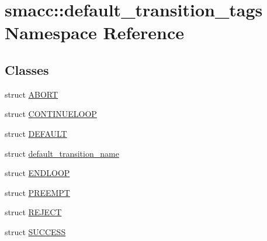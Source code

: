 \hypertarget{namespacesmacc_1_1default__transition__tags}{}\section{smacc\+:\+:default\+\_\+transition\+\_\+tags Namespace Reference}
\label{namespacesmacc_1_1default__transition__tags}
\subsection*{Classes}
\begin{DoxyCompactItemize}
\item 
struct \hyperlink{structsmacc_1_1default__transition__tags_1_1ABORT}{A\+B\+O\+RT}
\item 
struct \hyperlink{structsmacc_1_1default__transition__tags_1_1CONTINUELOOP}{C\+O\+N\+T\+I\+N\+U\+E\+L\+O\+OP}
\item 
struct \hyperlink{structsmacc_1_1default__transition__tags_1_1DEFAULT}{D\+E\+F\+A\+U\+LT}
\item 
struct \hyperlink{structsmacc_1_1default__transition__tags_1_1default__transition__name}{default\+\_\+transition\+\_\+name}
\item 
struct \hyperlink{structsmacc_1_1default__transition__tags_1_1ENDLOOP}{E\+N\+D\+L\+O\+OP}
\item 
struct \hyperlink{structsmacc_1_1default__transition__tags_1_1PREEMPT}{P\+R\+E\+E\+M\+PT}
\item 
struct \hyperlink{structsmacc_1_1default__transition__tags_1_1REJECT}{R\+E\+J\+E\+CT}
\item 
struct \hyperlink{structsmacc_1_1default__transition__tags_1_1SUCCESS}{S\+U\+C\+C\+E\+SS}
\end{DoxyCompactItemize}
